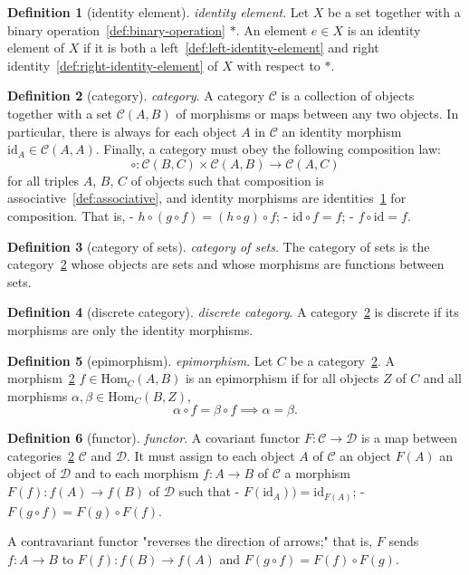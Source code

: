 \documentclass[12pt,a4paper]{article}
\theoremstyle{definition}
\newtheorem{definition}{Definition}
\begin{document}
\begin{definition}[identity element]\label{def:identity-element}
\emph{identity element}. Let $X$ be a set together with a binary operation~\ref{def:binary-operation} $*$. An element $e \in X$ is an identity element of $X$ if it is both a left~\ref{def:left-identity-element} and right identity~\ref{def:right-identity-element} of $X$ with respect to $*$.
\end{definition}

\begin{definition}[category]\label{def:category}
\emph{category}. A category $\mathcal C$ is a collection of objects together with a set $\mathcal C(A,B)$ of morphisms or maps between any two objects. In particular, there is always for each object $A$ in $\mathcal C$ an identity morphism $\text{id}_A \in\mathcal C(A,A)$. Finally, a category must obey the following composition law: $$\circ: \mathcal C(B,C)\times \mathcal C(A,B) \to \mathcal C(A,C)$$ for all triples $A$, $B$, $C$ of objects such that composition is associative~\ref{def:associative}, and identity morphisms  are identities~\ref{def:identity-element} for composition. That is, 
- $h\circ(g\circ f) = (h\circ g)\circ f$;
- $\text{id}\circ f = f$;
- $f\circ \text{id} = f$.
\end{definition}

\begin{definition}[category of sets]\label{def:category-of-sets}
\emph{category of sets}. The category of sets is the category~\ref{def:category} whose objects are sets and whose morphisms are functions between sets.
\end{definition}

\begin{definition}[discrete category]\label{def:discrete-category}
\emph{discrete category}. A category~\ref{def:category} is discrete if its morphisms are only the identity morphisms.
\end{definition}

\begin{definition}[epimorphism]\label{def:epimorphism}
\emph{epimorphism}. Let $C$ be a category~\ref{def:category}. A morphism~\ref{def:category} $f\in \text{Hom}_C(A,B)$ is an epimorphism if for all objects $Z$ of $C$ and all morphisms $\alpha,\beta\in \text{Hom}_C(B,Z)$, $$\alpha \circ f= \beta\circ f\implies \alpha = \beta.$$
\end{definition}

\begin{definition}[functor]\label{def:functor}
\emph{functor}. A covariant functor $F:\mathcal C\to \mathcal D$ is a map between categories~\ref{def:category} $\mathcal C$ and $\mathcal D$. It must assign to each object $A$ of $\mathcal C$ an object $F(A)$ an object of $\mathcal D$ and to each morphism $f:A\to B$ of $\mathcal C$ a morphism $F(f):f(A) \to f(B)$ of $\mathcal D$ such that
- $F(\text{id}_A)) = \text{id}_{F(A)}$;
- $F(g\circ f) = F(g)\circ F(f)$.

A contravariant functor "reverses the direction of arrows;" that is, $F$ sends $f:A\to B$ to $F(f): f(B) \to f(A)$ and $F(g\circ f) = F(f) \circ F(g)$.
\end{definition}
\end{document}
